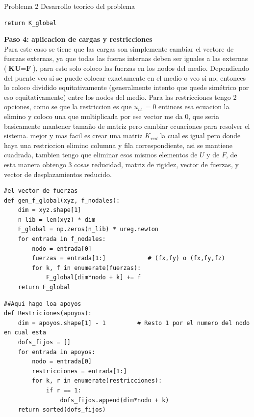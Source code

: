 \begin{desarrollo}{Problema 2 Desarrollo teorico del problema}
\begin{lstlisting}[style=pythonstyle, caption={Ensamblaje de la matriz de rigidez global}, label={lst:gen_matriz_global}]
    return K_global
\end{lstlisting}
\textbf{Paso 4: aplicacion de cargas y restricciones}\\
Para este caso se tiene que las cargas son simplemente cambiar el vectore de fuerzas externas, ya que todas las fueras internas deben ser iguales a las externas ($\textbf{KU}=\textbf{F}$), para esto solo coloco las fuerzas en los nodos del medio. Dependiendo del puente veo si se puede colocar exactamente en el medio o veo si no, entonces lo coloco dividido equitativamente (generalmente intento que quede simétrico por eso equitativamente) entre los nodos del medio.
Para las restricciones tengo 2 opciones, como se que la restriccion es que $u_{n1}=0$ entinces esa ecuacion la elimino y coloco una que multiplicada por ese vector me da 0, que seria basicamente mantener tamaño de matriz pero cambiar ecuaciones para resolver el sistema. mejor y mas facil es crear una matriz $K_{red}$ la cual es igual pero donde haya una restriccion elimino columna y fila correspondiente, asi se mantiene cuadrada, tambien tengo que eliminar esos mismos elementos de $U$ y de $F$, de esta manera obtengo 3 cosas reducidad, matriz de rigidez, vector de fuerzas, y vector de desplazamientos reducido.\\
\begin{lstlisting}[style=pythonstyle, caption={Ensamblaje del vector de fuerzas global}, label={lst:gen_f_global}]
#el vector de fuerzas 
def gen_f_global(xyz, f_nodales):
    dim = xyz.shape[1]
    n_lib = len(xyz) * dim
    F_global = np.zeros(n_lib) * ureg.newton
    for entrada in f_nodales:
        nodo = entrada[0]
        fuerzas = entrada[1:]            # (fx,fy) o (fx,fy,fz)
        for k, f in enumerate(fuerzas):
            F_global[dim*nodo + k] += f
    return F_global
\end{lstlisting}

\begin{lstlisting}[style=pythonstyle, caption={Determinación de los grados de libertad restringidos}, label={lst:restricciones}]
##Aqui hago loa apoyos
def Restriciones(apoyos):
    dim = apoyos.shape[1] - 1         # Resto 1 por el numero del nodo en cual esta
    dofs_fijos = []
    for entrada in apoyos:
        nodo = entrada[0]
        restricciones = entrada[1:]
        for k, r in enumerate(restricciones):
            if r == 1:
                dofs_fijos.append(dim*nodo + k)
    return sorted(dofs_fijos)
\end{lstlisting}


\end{desarrollo}
